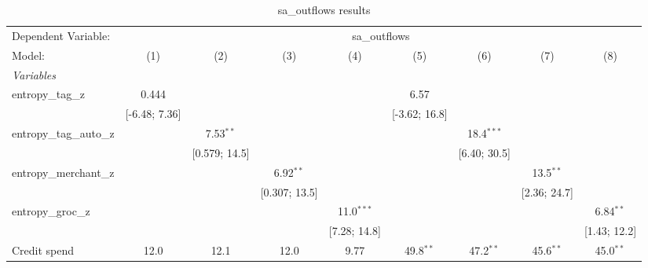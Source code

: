 
\begin{table}[htbp]
   \centering
   \tiny
   \begin{threeparttable}[b]
      \caption{\label{tab:reg_sa_outflows_full} sa\_outflows results}
      \begin{tabular}{lcccccccc}
         \tabularnewline \midrule \midrule
         Dependent Variable: & \multicolumn{8}{c}{sa\_outflows}\\
         Model:                   & (1)            & (2)            & (3)            & (4)            & (5)             & (6)             & (7)             & (8)\\  
         \midrule
         \emph{Variables}\\
         entropy\_tag\_z          & 0.444          &                &                &                & 6.57            &                 &                 &   \\   
                                  & [-6.48; 7.36]  &                &                &                & [-3.62; 16.8]   &                 &                 &   \\   
         entropy\_tag\_auto\_z    &                & 7.53$^{**}$    &                &                &                 & 18.4$^{***}$    &                 &   \\   
                                  &                & [0.579; 14.5]  &                &                &                 & [6.40; 30.5]    &                 &   \\   
         entropy\_merchant\_z     &                &                & 6.92$^{**}$    &                &                 &                 & 13.5$^{**}$     &   \\   
                                  &                &                & [0.307; 13.5]  &                &                 &                 & [2.36; 24.7]    &   \\   
         entropy\_groc\_z         &                &                &                & 11.0$^{***}$   &                 &                 &                 & 6.84$^{**}$\\   
                                  &                &                &                & [7.28; 14.8]   &                 &                 &                 & [1.43; 12.2]\\   
         Credit spend             & 12.0           & 12.1           & 12.0           & 9.77           & 49.8$^{**}$     & 47.2$^{**}$     & 45.6$^{**}$     & 45.0$^{**}$\\   

\end{tabular}
\end{threeparttable}
\end{table}
